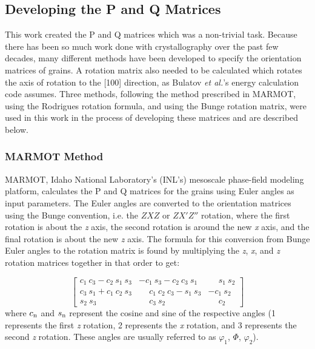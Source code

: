\documentclass[twoside,senior]{BYUPhys}
\begin{document}
\subsection{Developing the P and Q Matrices\label{chi2:PQ}}
This work created the P and Q matrices which was a non-trivial task.  Because there has been so much work done with crystallography over the past few decades, many different methods have been developed to specify the orientation matrices of grains. A rotation matrix also needed to be calculated which rotates the axis of rotation to the [100] direction, as Bulatov \emph{et al.}'s energy calculation code assumes.  Three methods, following the method prescribed in MARMOT, using the Rodrigues rotation formula, and using the Bunge rotation matrix, were used in this work in the process of developing these matrices and are described below.

\subsubsection{MARMOT Method\label{PQ:MARMOT}}
MARMOT, Idaho National Laboratory's (INL's) mesoscale phase-field modeling platform,\cite{tonks2012} calculates the P and Q matrices for the grains using Euler angles as input parameters.  The Euler angles are converted to the orientation matrices using the Bunge convention, i.e. the $ZXZ$ or $ZX'Z''$ rotation, where the first rotation is about the \emph{z} axis, the second rotation is around the new \emph{x} axis, and the final rotation is about the new \emph{z} axis.  The formula for this conversion from Bunge Euler angles to the rotation matrix is found by multiplying the \emph{z}, \emph{x}, and \emph{z} rotation matrices together in that order to get:

\begin{equation}
\label{eq:bungeMat}
\left[
\begin{array}{ccc}
c_1\ c_3 - c_2\ s_1\ s_3 & -c_1\ s_3 - c_2\ c_3\ s_1 & \phantom{-}s_1\ s_2 \\
c_3\ s_1 + c_1\ c_2\ s_3 & \phantom{-}c_1\ c_2\ c_3 - s_1\ s_3 & -c_1\ s_2 \\
s_2\ s_3 & \phantom{-}c_3\ s_2 & \phantom{-}c_2 
\end{array}
\right]
\end{equation}
where $c_\textnormal{n}$ and $s_\textnormal{n}$ represent the cosine and sine of the respective angles (1 represents the first \emph{z} rotation, 2 represents the \emph{x} rotation, and 3 represents the second \emph{z} rotation.  These angles are usually referred to as\cite{randle2000} $\varphi_1$, $\Phi$, $\varphi_2$).
\end{document}
